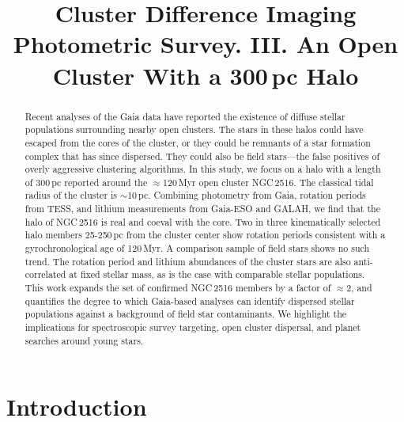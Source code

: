 \documentclass[12pt,twocolumn,tighten]{aastex63}
\begin{document}

\title{
  Cluster Difference Imaging Photometric Survey. III.
  An Open Cluster With a 300\,pc Halo
}



\begin{abstract}
  Recent analyses of the Gaia data have reported the existence of
  diffuse stellar populations surrounding nearby open clusters. 
  The stars in these halos could have escaped from the cores of the
  cluster, or they could be remnants of a star formation complex that
  has since dispersed.
  They could also be field stars---the false positives of overly
  aggressive clustering algorithms.
  In this study, we focus on a halo with a length of 300\,pc reported
  around the $\approx$120\,Myr open cluster NGC\,2516.
  The classical tidal radius of the cluster is $\sim$10\,pc.
  Combining photometry from Gaia, rotation periods from TESS, and
  lithium measurements from Gaia-ESO and GALAH, we find that the halo
  of NGC\,2516 is real and coeval with the core.
  Two in three kinematically selected halo members 25-250\,pc from the
  cluster center show rotation periods consistent with a
  gyrochronological age of 120\,Myr.
  A comparison sample of field stars shows no such trend.
  The rotation period and lithium abundances of the cluster stars are
  also anti-correlated at fixed stellar mass, as is the case with
  comparable stellar populations.
  This work expands the set of confirmed NGC\,2516 members by a factor
  of $\approx$2, and quantifies the degree to which Gaia-based
  analyses can identify dispersed stellar populations against a
  background of field star contaminants.
  We highlight the implications for spectroscopic survey targeting,
  open cluster dispersal, and planet searches around young stars.
\end{abstract}





\section{Introduction}
\end{document}
